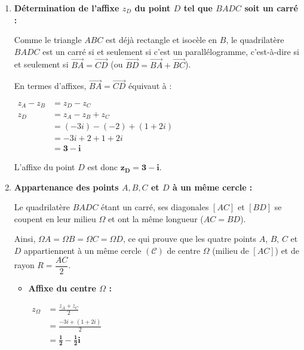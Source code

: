 \documentclass[12pt,a4paper]{article}
\begin{document}
\begin{enumerate}
    Le triangle $ABC$ possède donc deux côtés de même longueur ($BA = BC$) et un angle droit en $B$.
    
    Le triangle $ABC$ est donc \textbf{rectangle et isocèle en $B$} (et direct).

    \item \textbf{Détermination de l'affixe $z_D$ du point $D$ tel que $BADC$ soit un carré :}
    
    Comme le triangle $ABC$ est déjà rectangle et isocèle en $B$, le quadrilatère $BADC$ est un carré si et seulement si c'est un parallélogramme, c'est-à-dire si et seulement si $\overrightarrow{BA} = \overrightarrow{CD}$ (ou $\overrightarrow{BD} = \overrightarrow{BA} + \overrightarrow{BC}$).
    
    En termes d'affixes, $\overrightarrow{BA} = \overrightarrow{CD}$ équivaut à :
    
    $
    \begin{aligned}
        z_A - z_B &= z_D - z_C\\
        z_D &= z_A - z_B + z_C\\
        &= (-3i) - (-2) + (1 + 2i)\\
        &= -3i + 2 + 1 + 2i\\
        &= \mathbf{3 - i}
    \end{aligned}
    $
    
    L'affixe du point $D$ est donc $\mathbf{z_D = 3 - i}$.

    \item \textbf{Appartenance des points $A, B, C$ et $D$ à un même cercle :}
    
    Le quadrilatère $BADC$ étant un carré, ses diagonales $[AC]$ et $[BD]$ se coupent en leur milieu $\Omega$ et ont la même longueur ($AC = BD$).
    
    Ainsi, $\Omega A = \Omega B = \Omega C = \Omega D$, ce qui prouve que les quatre points $A$, $B$, $C$ et $D$ appartiennent à un même cercle $(\mathcal{C})$ de centre $\Omega$ (milieu de $[AC]$) et de rayon $R = \dfrac{AC}{2}$.
    
    \begin{itemize}
        \item \textbf{Affixe du centre $\Omega$ :}
        
        $
        \begin{aligned}
            z_\Omega &= \frac{z_A + z_C}{2}\\
            &= \frac{-3i + (1 + 2i)}{2}\\
            &= \mathbf{\frac{1}{2} - \frac{1}{2}i}
        \end{aligned}
        $
        

\end{itemize}
\end{enumerate}
\end{document}
